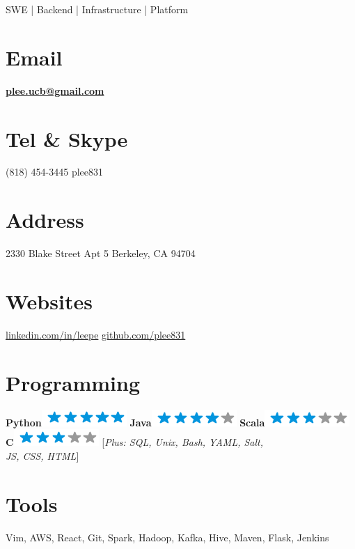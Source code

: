 \documentclass[]{friggeri-cv}
\begin{document}
    {SWE | Backend | Infrastructure | Platform}
      

\begin{aside}
  \section{Email}
    \href{mailto:peterl@berkeley.edu}{\textbf{plee.ucb@gmail.com}}
    ~
  \section{Tel \& Skype}
    (818) 454-3445
    plee831
    ~
  \section{Address}
    2330 Blake Street Apt 5
    Berkeley, CA 94704
    ~
  \section{Websites}
    \href{https://www.linkedin.com/in/plee831}{linkedin.com/in/leepe}
    \href{https://github.com/plee831}{github.com/plee831}
    ~
  \section{Programming}
    \textbf{Python}\includegraphics[scale=0.40]{img/5stars.png}
    \textbf{Java}\includegraphics[scale=0.40]{img/4stars.png}
    \textbf{Scala}\includegraphics[scale=0.40]{img/3stars.png}
    \textbf{C}\includegraphics[scale=0.40]{img/3stars.png}
    [\emph{Plus: SQL, Unix, Bash, YAML, Salt, \\ JS, CSS, HTML}]
    ~
   \section{Tools}
    Vim, AWS, React, Git, Spark, Hadoop, Kafka, Hive, Maven, Flask, Jenkins
    ~

\end{aside}
\end{document}
